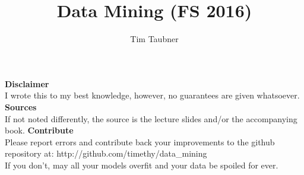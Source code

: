 \documentclass[11pt]{scrartcl}
\title{Data Mining (FS 2016)}
\author{Tim Taubner}
\begin{document}
\pagestyle{fancy}
\fancyhead{}
\fancyfoot{}

\begin{centering}
\vspace*{1em}
\vfill
\textbf{Disclaimer} \\
I wrote this to my best knowledge, however, no guarantees are given whatsoever.
\vfill
\textbf{Sources} \\
If not noted differently, the source is the lecture slides and/or the accompanying book.
\vfill
\textbf{Contribute} \\
Please report errors and contribute back your improvements to the github repository at:
http://github.com/timethy/data\_mining \\
If you don't, may all your models overfit and your data be spoiled for ever.
\vfill
\end{centering}

\setcounter{page}{0}

\clearpage
\end{document}
